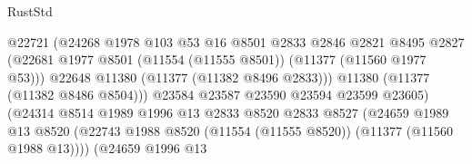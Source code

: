 \begin{lexlean}{RustStd}
\begin{coremodule}
                                            @22721
                                            (@24268
                                              @1978
                                              @103
                                              @53
                                              @16
                                              @8501
                                              @2833
                                              @2846
                                              @2821
                                              @8495
                                              @2827
                                              (@22681
                                                @1977
                                                @8501
                                                (@11554 (@11555 @8501))
                                                (@11377 (@11560 @1977 @53)))
                                              @22648
                                              @11380
                                              (@11377 (@11382 @8496 @2833)))
                                            @11380
                                            (@11377 (@11382 @8486 @8504)))
                                          @23584
                                          @23587
                                          @23590
                                          @23594
                                          @23599
                                          @23605)
                                        (@24314
                                          @8514
                                          @1989
                                          @1996
                                          @13
                                          @2833
                                          @8520
                                          @2833
                                          @8527
                                          (@24659
                                            @1989
                                            @13
                                            @8520
                                            (@22743
                                              @1988
                                              @8520
                                              (@11554 (@11555 @8520))
                                              (@11377 (@11560 @1988 @13))))
                                          (@24659
                                            @1996
                                            @13

\end{coremodule}
\end{lexlean}
